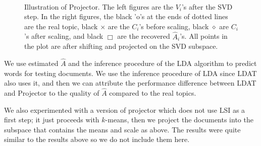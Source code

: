 \begin{figure}[h]
     \begin{center}

        \\ 

    \end{center}
    \caption{Illustration of Projector. The left figures are the $V_i$'s after the SVD step. In the right figures, the black 'o's at the ends of dotted lines are the real topic, black $\times$ are the $C_i$'s before scaling, black $\diamond$ are $C_i$'s after scaling, and black $\Box$ are the recovered $\hat{A}_i$'s. All points in the plot are after shifting and projected on the SVD subspace. }
   \label{fig:subfigures}
\end{figure}


We use estimated $\hat{A}$ and the inference procedure of the LDA
algorithm to predict words for testing documents. We use the inference
procedure of LDA since LDAT also uses it, and then we can attribute
the performance difference between LDAT and Projector to the quality
of $\hat{A}$ compared to the real topics.

We also experimented with a version of projector which does
not use LSI as a first step; it just proceeds
with $k$-means, then we project the documents into the subspace
that contains the means and scale as above.  The results
were quite similar to the results above so we do not
include them here. 


